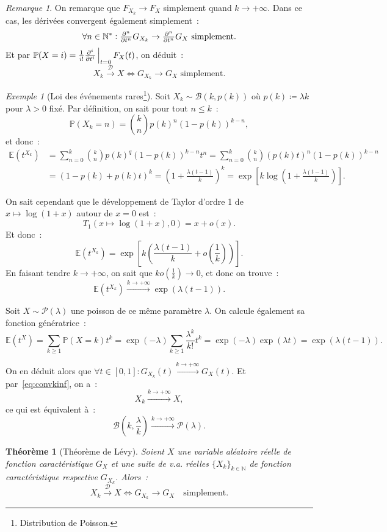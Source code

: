 \documentclass{article}
\newcommand{\E}{\mathbb E}
\newcommand{\N}{\mathbb N}
\renewcommand{\P}{\mathbb P}
\newcommand{\convl}{\stackrel{\mathcal D}\to}  %
\newcommand{\evipd}[3][i]{\pd[#1] {}{#2}\sVert[2]_{#2=#3}}  %
\newtheorem{thm}{Théorème}[section]
\theoremstyle{definition}
\theoremstyle{remark}
\newtheorem*{rmq}{Remarque}
\newtheorem{ex}{Exemple}
\begin{document}
		\begin{rmq} On remarque que $F_{X_k} \to F_X$ simplement quand $k \to +\infty$. Dans ce cas, les dérivées convergent également simplement~:
		\[\forall n \in \N^* : \pd[n] {}tG_{X_k} \to \pd[n] {}tG_X \text{ simplement}.\]
		Et par $\P(X=i) = \frac 1{i!}\evipd t0F_X(t)$, on déduit~:
		\[X_k \convl X \iff G_{X_k} \to G_X \text{ simplement}.\]
		\end{rmq}

		\begin{ex}[Loi des événements rares\footnote{Distribution de Poisson.}] Soit $X_k \sim \mathcal B(k, p(k))$ où $p(k) \coloneqq \lambda k$ pour
		$\lambda > 0$ fixé. Par définition, on sait pour tout $n \leq k$~:
		\[\P(X_k = n) = \binom knp(k)^n(1-p(k))^{k-n},\]
		et donc~:
		\begin{align*}
			\E\left(t^{X_k}\right) &= \sum_{n=0}^k\binom knp(k)^q(1-p(k))^{k-n}t^n = \sum_{n=0}^k\binom kn\left(p(k)t\right)^n\left(1-p(k)\right)^{k-n} \\
			&= (1-p(k) + p(k)t)^k = \left(1 + \frac {\lambda(t-1)}k\right)^k = \exp\left[k\log\left(1 + \frac {\lambda(t-1)}k\right)\right].
		\end{align*}

		On sait cependant que le développement de Taylor d'ordre 1 de $x \mapsto \log(1+x)$ autour de $x=0$ est~:
		\[T_1(x \mapsto \log(1+x), 0) = x + o(x).\]
		Et donc~:
		\[\E\left(t^{X_k}\right) = \exp\left[k\left(\frac {\lambda(t-1)}k + o\left(\frac 1k\right)\right)\right].\]
		En faisant tendre $k \to +\infty$, on sait que $k o\left(\frac 1k\right) \to 0$, et donc on trouve~:
		\[\E\left(t^{X_k}\right) \stackrel{k \to +\infty}\to\exp\left(\lambda(t-1)\right).\]

		Soit $X \sim \mathcal P(\lambda)$ une poisson de ce même paramètre $\lambda$. On calcule également sa fonction génératrice~:
		\[\E\left(t^X\right) = \sum_{k \geq 1}\P(X=k)t^k = \exp(-\lambda)\sum_{k \geq 1}\frac {\lambda^k}{k!}t^k = \exp(-\lambda)\exp(\lambda t)
		= \exp\left(\lambda(t-1)\right).\]

		On en déduit alors que $\forall t \in [0, 1] : G_{X_k}(t) \stackrel {k \to +\infty}\to G_X(t)$. Et par~\eqref{eq:convkinf}, on a~:
		\[X_k \stackrel {k \to +\infty}\to X,\]
		ce qui est équivalent à~:
		\[\mathcal B\left(k, \frac \lambda k\right) \stackrel {k \to +\infty}\to \mathcal P(\lambda).\]
		\end{ex}

		\begin{thm}[Théorème de Lévy] Soient $X$ une variable aléatoire réelle de fonction caractéristique $G_X$ et une suite de v.a. réelles $\{X_k\}_{k \in \N}$
		de fonction caractéristique respective $G_{X_k}$. Alors~:
		\[X_k \convl X \iff G_{X_k} \to G_X\quad\text{simplement}.\]
		\end{thm}
\end{document}
